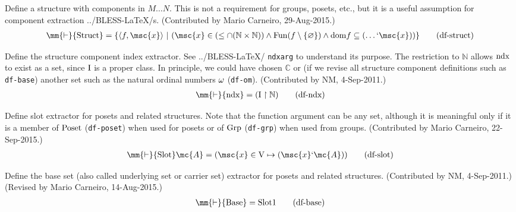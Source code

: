 
\begin{metadefinition} Define a structure with components in
$M \ldots N$.  This is not a
       requirement for groups, posets, etc., but it is a useful assumption for
       component extraction ../BLESS-LaTeX/s.  (Contributed by Mario Carneiro,
       29-Aug-2015.)
\begin{align}
\mm{\vdash} {\rm Struct} = \{ \langle f , \msc{x} \rangle ~\vert~ ( \msc{x} \in
    ( \le \cap ( \mathbb{N} \times \mathbb{N} ) ) \wedge {\rm Fun} ( f
    \setminus \{ \varnothing \} ) \wedge {\rm dom} f \subseteq ( \ldots `
    \msc{x} ) ) \}\label{eq:df-struct}\tag{df-struct}
\end{align}
\end{metadefinition}


\begin{metadefinition} Define the structure component index
extractor.  See ../BLESS-LaTeX/ {\tt ndxarg} to
     understand its purpose.  The restriction to $\mathbb{N}$ allows ${\rm
ndx}$ to exist
     as a set, since ${\rm I}$ is a proper class.  In principle, we could have
     chosen $\mathbb{C}$ or (if we revise all structure component definitions
such as
     {\tt df-base}) another set such as the natural ordinal numbers ${\rm
\omega}$
     ({\tt df-om}).  (Contributed by NM, 4-Sep-2011.)
\begin{align}
\mm{\vdash} {\rm ndx} = ( {\rm I} \restriction \mathbb{N}
    )\label{eq:df-ndx}\tag{df-ndx}
\end{align}
\end{metadefinition}


\begin{metadefinition} Define slot extractor for posets and
related structures.  Note that the
       function argument can be any set, although it is meaningful only if it
       is a member of ${\rm Poset}$ ({\tt df-poset}) when used for posets or
of
       ${\rm Grp}$ ({\tt df-grp}) when used from groups.  (Contributed by
Mario
       Carneiro, 22-Sep-2015.)
\begin{align}
\mm{\vdash} {\rm Slot} \mc{A} = ( \msc{x} \in {\rm V} \mapsto ( \msc{x} `
    \mc{A} ) )\label{eq:df-slot}\tag{df-slot}
\end{align}
\end{metadefinition}

\begin{metadefinition} Define the base set (also called
underlying set or carrier set) extractor
     for posets and related structures.  (Contributed by NM, 4-Sep-2011.)
     (Revised by Mario Carneiro, 14-Aug-2015.)
\begin{align}
\mm{\vdash} {\rm Base} = {\rm Slot} 1\label{eq:df-base}\tag{df-base}
\end{align}
\end{metadefinition}


